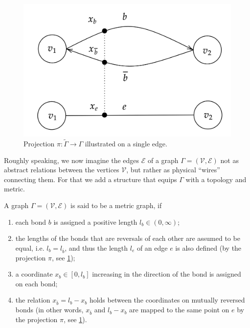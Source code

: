 \begin{figure}[H]
    \begin{center}
        \includegraphics[scale=0.2]{img/diagram-20220201_3.png}
    \end{center}
    \caption{Projection $\pi \colon \widetilde{\Gamma} \to \Gamma$ illustrated on a single edge.}
    \label{fig3}
\end{figure}

Roughly speaking, we now imagine the edges $\mathcal{E}$ of a graph $\Gamma = (\mathcal{V}, \mathcal{E})$ not as abstract relations between the vertices $\mathcal{V}$, but rather as physical “wires” connecting them. For that we add a structure that equips $\Gamma$ with a topology and metric. 

\begin{definition}\label{metric graph}
    A graph $\Gamma = (\mathcal{V}, \mathcal{E})$ is said to be a metric graph, if 
    \begin{enumerate}
        \item each bond $b$ is assigned a positive length $l_b \in (0, \infty)$;
        \item the lengths of the bonds that are reversals of each other are assumed to be equal, i.e. $l_b = l_{\overline{b}}$, and thus the length $l_e$ of an edge $e$ is also defined (by the projection $\pi$, see \cref{fig3});
        \item a coordinate $x_b \in [0, l_b]$ increasing in the direction of the bond is assigned on each bond;
        \item the relation $x_{\overline{b}} = l_b − x_b$ holds between the coordinates on mutually reversed bonds (in other words, $x_{\overline{b}}$ and $l_b − x_b$ are mapped to the same point on $e$ by the projection $\pi$, see \cref{fig3}).
    \end{enumerate}
\end{definition}

